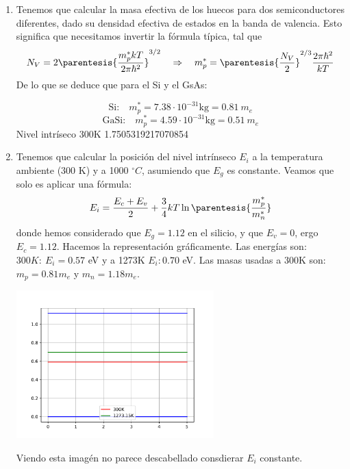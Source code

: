 	\begin{enumerate}[label=\alph*)]
		\item	Tenemos que calcular la masa efectiva de los huecos para dos semiconductores diferentes, dado su densidad efectiva de estados en la banda de valencia. Esto significa que necesitamos invertir la fórmula típica, tal que
		      \begin{equation}
			      N_V = 2 \parentesis{\frac{m_p^* kT}{2\pi\hbar^2}}^{3/2} \quad \Rightarrow \quad m_p^* = \parentesis{\frac{N_V}{2}}^{2/3} {\frac{2 \pi \hbar^2}{kT}}
		      \end{equation}
		      De lo que se deduce que para el Si y el GsAs:

		      \begin{equation}
			      \text{Si:} \quad m_p^* = 7.38\cdot10^{-31} \text{kg} = 0.81 \ {m}_e
		      \end{equation}
		      \begin{equation}
			      \text{GaSi:}\quad m_p^* = 4.59 \cdot10^{-31} \text{kg} = 0.51 \ {m}_e
		      \end{equation}
		      Nivel intríseco 300K 1.7505319217070854
		\item Tenemos que calcular la posición del nivel intrínseco $E_i$ a la temperatura ambiente (300 K) y a 1000 $^\circ C$, asumiendo que $E_g$ es constante. Veamos que solo es aplicar una fórmula:
		      \begin{equation}
			      E_i = \frac{E_c+E_v}{2} + \frac{3}{4} kT \ln\parentesis{\frac{m_p^*}{m_n^*}}
		      \end{equation}
		      donde hemos considerado que $E_g=1.12$ en el silicio, y que $E_v=0$, ergo $E_c=1.12$. Hacemos la representación gráficamente. Las energías son: $300K: \ E_i=0.57$ eV y a 1273K $E_i: 0.70$ eV. Las masas usadas a 300K son: $m_p=0.81m_e$ y $m_n=1.18m_e$.
		      \begin{center}
			      \includegraphics[width=0.6\textwidth]{Cuerpo/Ch_01/Ejercicio_01_5.pdf}
		      \end{center}
		      Viendo esta imagén no parece descabellado consdierar $E_i$ constante.
	\end{enumerate}
